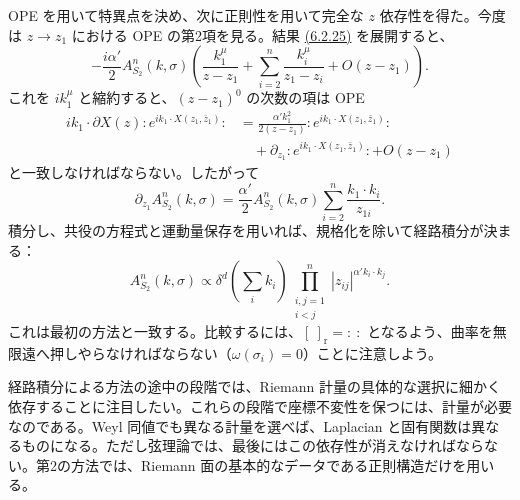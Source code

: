 OPE を用いて特異点を決め、次に正則性を用いて完全な $z$ 依存性を得た。今度は $z\to z_1$ における OPE の第2項を見る。結果 \hyperref[eq:6.2.25]{(6.2.25)} を展開すると、
\begin{equation}
-\frac{i\alpha'}2A_{S_2}^n(k,\sigma)
\left(\frac{k_1^\mu}{z-z_1}+\sum_{i=2}^n\frac{k_i^\mu}{z_1-z_i}+O(z-z_1)\right).
\tag{6.2.28}\label{eq:6.2.28}
\end{equation}
これを $ik_1^\mu$ と縮約すると、$(z-z_1)^0$ の次数の項は OPE
\begin{equation}
\begin{aligned}
ik_1\cdot\partial X(z):e^{ik_1\cdot X(z_1,\bar z_1)}:
&=\frac{\alpha'k_1^2}{2(z-z_1)}:e^{ik_1\cdot X(z_1,\bar z_1)}:\\
&\quad+\partial_{z_1}:e^{ik_1\cdot X(z_1,\bar z_1)}:+O(z-z_1)
\end{aligned}
\tag{6.2.29}\label{eq:6.2.29}
\end{equation}
と一致しなければならない。したがって
\begin{equation}
\partial_{z_1}A_{S_2}^n(k,\sigma)=\frac{\alpha'}2A_{S_2}^n(k,\sigma)
\sum_{i=2}^n\frac{k_1\cdot k_i}{z_{1i}}.
\tag{6.2.30}\label{eq:6.2.30}
\end{equation}
積分し、共役の方程式と運動量保存を用いれば、規格化を除いて経路積分が決まる：
\begin{equation}
A_{S_2}^n(k,\sigma)\propto\delta^d\!\left(\sum_i k_i\right)
\prod_{\substack{i,j=1\\i<j}}^n|z_{ij}|^{\alpha'k_i\cdot k_j}.
\tag{6.2.31}\label{eq:6.2.31}
\end{equation}
これは最初の方法と一致する。比較するには、$[\ ]_{\mathrm r}=:\ :$ となるよう、曲率を無限遠へ押しやらなければならない（$\omega(\sigma_i)=0$）ことに注意しよう。

経路積分による方法の途中の段階では、Riemann 計量の具体的な選択に細かく依存することに注目したい。これらの段階で座標不変性を保つには、計量が必要なのである。Weyl 同値でも異なる計量を選べば、Laplacian と固有関数は異なるものになる。ただし弦理論では、最後にはこの依存性が消えなければならない。第2の方法では、Riemann 面の基本的なデータである正則構造だけを用いる。


